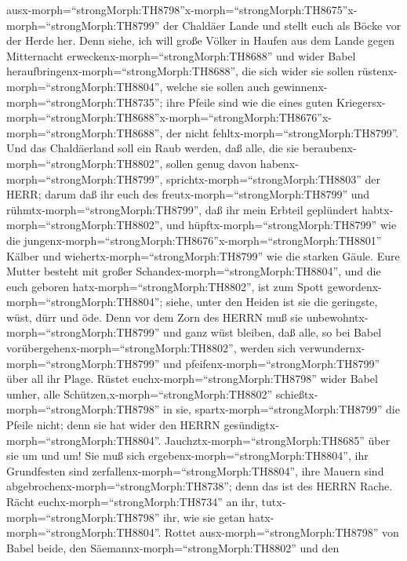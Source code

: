 ausx-morph=``strongMorph:TH8798''\textbar x-morph=``strongMorph:TH8675''x-morph=``strongMorph:TH8799''
der Chaldäer Lande und stellt euch als Böcke vor der Herde her.
 Denn siehe, ich will große Völker in Haufen aus dem Lande
gegen Mitternacht erweckenx-morph=``strongMorph:TH8688'' und wider Babel
heraufbringenx-morph=``strongMorph:TH8688'', die sich wider sie sollen
rüstenx-morph=``strongMorph:TH8804'', welche sie sollen auch
gewinnenx-morph=``strongMorph:TH8735''; ihre Pfeile sind wie die eines
guten
Kriegersx-morph=``strongMorph:TH8688''\textbar x-morph=``strongMorph:TH8676''x-morph=``strongMorph:TH8688'',
der nicht fehltx-morph=``strongMorph:TH8799''.  Und das
Chaldäerland soll ein Raub werden, daß alle, die sie
beraubenx-morph=``strongMorph:TH8802'', sollen genug davon
habenx-morph=``strongMorph:TH8799'',
sprichtx-morph=``strongMorph:TH8803'' der HERR;  darum daß
ihr euch des freutx-morph=``strongMorph:TH8799'' und
rühmtx-morph=``strongMorph:TH8799'', daß ihr mein Erbteil geplündert
habtx-morph=``strongMorph:TH8802'', und
hüpftx-morph=``strongMorph:TH8799'' wie die
jungenx-morph=``strongMorph:TH8676''x-morph=``strongMorph:TH8801''
Kälber und wiehertx-morph=``strongMorph:TH8799'' wie die starken Gäule.
 Eure Mutter besteht mit großer
Schandex-morph=``strongMorph:TH8804'', und die euch geboren
hatx-morph=``strongMorph:TH8802'', ist zum Spott
gewordenx-morph=``strongMorph:TH8804''; siehe, unter den Heiden ist sie
die geringste, wüst, dürr und öde.  Denn vor dem Zorn des
HERRN muß sie unbewohntx-morph=``strongMorph:TH8799'' und ganz wüst
bleiben, daß alle, so bei Babel
vorübergehenx-morph=``strongMorph:TH8802'', werden sich
verwundernx-morph=``strongMorph:TH8799'' und
pfeifenx-morph=``strongMorph:TH8799'' über all ihr Plage. 
Rüstet euchx-morph=``strongMorph:TH8798'' wider Babel umher, alle
Schützen,x-morph=``strongMorph:TH8802''
schießtx-morph=``strongMorph:TH8798'' in sie,
spartx-morph=``strongMorph:TH8799'' die Pfeile nicht; denn sie hat wider
den HERRN gesündigtx-morph=``strongMorph:TH8804''. 
Jauchztx-morph=``strongMorph:TH8685'' über sie um und um! Sie muß sich
ergebenx-morph=``strongMorph:TH8804'', ihr Grundfesten sind
zerfallenx-morph=``strongMorph:TH8804'', ihre Mauern sind
abgebrochenx-morph=``strongMorph:TH8738''; denn das ist des HERRN Rache.
Rächt euchx-morph=``strongMorph:TH8734'' an ihr,
tutx-morph=``strongMorph:TH8798'' ihr, wie sie getan
hatx-morph=``strongMorph:TH8804''.  Rottet
ausx-morph=``strongMorph:TH8798'' von Babel beide, den
Säemannx-morph=``strongMorph:TH8802'' und den
